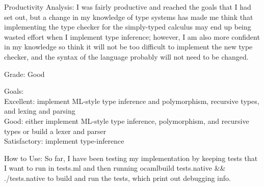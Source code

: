 \documentclass{article}
\begin{document}
Productivity Analysis:
I was fairly productive and reached the goals that I had set out, but a change in my knowledge of type systems has made me think that implementing the type checker for the simply-typed calculus may end up being wasted effort when I implement type inference; however, I am also more confident in my knowledge so think it will not be too difficult to implement the new type checker, and the syntax of the language probably will not need to be changed.

Grade:
Good

Goals:\\
Excellent: implement ML-style type inference and polymorphism, recursive types, and lexing and parsing\\
Good: either implement ML-style type inference, polymorphism, and recursive types or build a lexer and parser\\
Satisfactory: implement type-inference 

How to Use:
So far, I have been testing my implementation by keeping tests that I want to run in tests.ml and then running ocamlbuild tests.native \&\& ./tests.native to build and run the tests, which print out debugging info.
\end{document}
